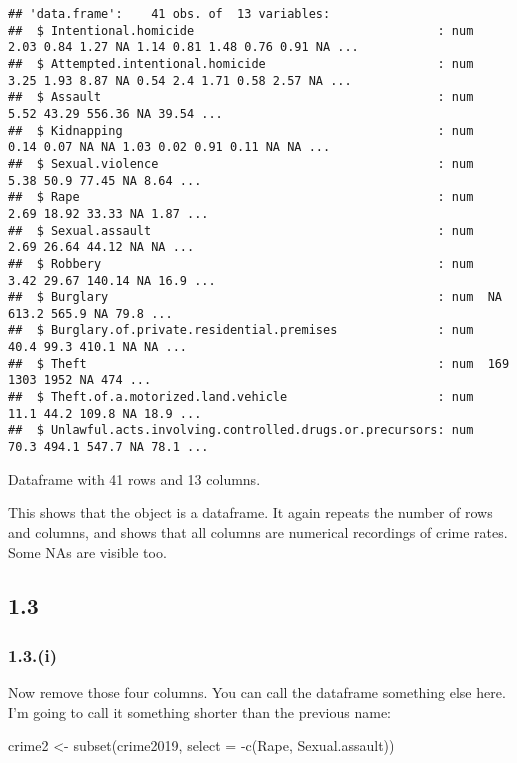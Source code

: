 \documentclass[
]{article}
\newenvironment{Shaded}{\begin{snugshade}}{\end{snugshade}}
\newcommand{\AttributeTok}[1]{\textcolor[rgb]{0.77,0.63,0.00}{#1}}
\newcommand{\FunctionTok}[1]{\textcolor[rgb]{0.00,0.00,0.00}{#1}}
\newcommand{\NormalTok}[1]{#1}
\newcommand{\OtherTok}[1]{\textcolor[rgb]{0.56,0.35,0.01}{#1}}
\newcommand{\SpecialCharTok}[1]{\textcolor[rgb]{0.00,0.00,0.00}{#1}}
\begin{document}
\begin{verbatim}
## 'data.frame':    41 obs. of  13 variables:
##  $ Intentional.homicide                                  : num  2.03 0.84 1.27 NA 1.14 0.81 1.48 0.76 0.91 NA ...
##  $ Attempted.intentional.homicide                        : num  3.25 1.93 8.87 NA 0.54 2.4 1.71 0.58 2.57 NA ...
##  $ Assault                                               : num  5.52 43.29 556.36 NA 39.54 ...
##  $ Kidnapping                                            : num  0.14 0.07 NA NA 1.03 0.02 0.91 0.11 NA NA ...
##  $ Sexual.violence                                       : num  5.38 50.9 77.45 NA 8.64 ...
##  $ Rape                                                  : num  2.69 18.92 33.33 NA 1.87 ...
##  $ Sexual.assault                                        : num  2.69 26.64 44.12 NA NA ...
##  $ Robbery                                               : num  3.42 29.67 140.14 NA 16.9 ...
##  $ Burglary                                              : num  NA 613.2 565.9 NA 79.8 ...
##  $ Burglary.of.private.residential.premises              : num  40.4 99.3 410.1 NA NA ...
##  $ Theft                                                 : num  169 1303 1952 NA 474 ...
##  $ Theft.of.a.motorized.land.vehicle                     : num  11.1 44.2 109.8 NA 18.9 ...
##  $ Unlawful.acts.involving.controlled.drugs.or.precursors: num  70.3 494.1 547.7 NA 78.1 ...
\end{verbatim}

Dataframe with 41 rows and 13 columns.

This shows that the object is a dataframe. It again repeats the number
of rows and columns, and shows that all columns are numerical recordings
of crime rates. Some NAs are visible too.

\hypertarget{section-2}{%
\subsection{1.3}\label{section-2}}

\hypertarget{i}{%
\subsubsection{1.3.(i)}\label{i}}

Now remove those four columns. You can call the dataframe something else
here. I'm going to call it something shorter than the previous name:

\begin{Shaded}
\begin{Highlighting}[]
\NormalTok{crime2 }\OtherTok{\textless{}{-}} \FunctionTok{subset}\NormalTok{(crime2019,}
                 \AttributeTok{select =} \SpecialCharTok{{-}}\FunctionTok{c}\NormalTok{(Rape,}
\NormalTok{                             Sexual.assault))}
\end{Highlighting}
\end{Shaded}
\end{document}
